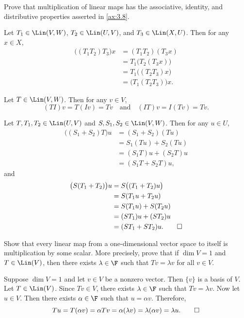 \begin{exc}
\begin{exercise}
Prove that multiplication of linear maps has the associative, identity, and
distributive properties asserted in \ref{ax:3.8}.
\end{exercise}
\begin{solution}\leavevmode
\begin{parts}
\item Let $T_1\in\Lin(V,W)$, $T_2\in\Lin(U,V)$, and $T_3\in\Lin(X,U)$. Then
  for any $x\in X$,
  \begin{align*}
  \bigl((T_1T_2)T_3\bigr)x &= (T_1T_2)(T_3x)\\
    &= T_1\bigl(T_2(T_3x)\bigr)\\
    &= T_1\bigl((T_2T_3)x\bigr)\\
    &= \bigl(T_1(T_2T_3)\bigr)x.
  \end{align*}
\item Let $T\in\Lin(V,W)$. Then for any $v\in V$,
  \[ (TI)v=T(Iv)=Tv \quad\text{and}\quad (IT)v=I(Tv)=Tv. \]
\item Let $T,T_1,T_2\in\Lin(U,V)$ and $S,S_1,S_2\in\Lin(V,W)$. Then for any
  $u\in U$,
  \begin{align*}
  \bigl((S_1+S_2)T\bigr)u &= (S_1+S_2)(Tu)\\
    &= S_1(Tu)+S_2(Tu)\\
    &= (S_1T)u+(S_2T)u\\
    &= (S_1T+S_2T)u,
  \end{align*}
  and
  \begin{align*}
  \bigl(S(T_1+T_2)\bigr)u &= S\bigl((T_1+T_2)u\bigr)\\
    &= S(T_1u+T_2u)\\
    &= S(T_1u)+S(T_2u)\\
    &= (ST_1)u+(ST_2)u\\
    &= (ST_1+ST_2)u. \qedhere
  \end{align*}
\end{parts}
\end{solution}

\begin{exercise}
Show that every linear map from a one-dimensional vector space to itself is
multiplication by some scalar. More precisely, prove that if $\dim V=1$ and
$T\in\Lin(V)$, then there exists $\lambda\in\F$ such that $Tv=\lambda v$ for
all $v\in V$.
\end{exercise}
\begin{solution}
Suppose $\dim V=1$ and let $v\in V$ be a nonzero vector. Then $\{v\}$ is a
basis of $V$. Let $T\in\Lin(V)$. Since $Tv\in V$, there exists $\lambda\in\F$
such that $Tv=\lambda v$. Now let $u\in V$. Then there exists $\alpha\in\F$
such that $u=\alpha v$. Therefore,
\[ Tu=T(\alpha v)=\alpha Tv=\alpha(\lambda v)=\lambda(\alpha v)=\lambda u.
   \qedhere \]
\end{solution}


\end{exc}
